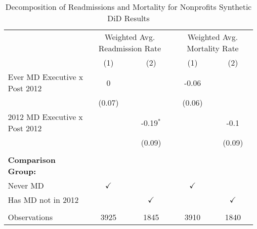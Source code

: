 \begin{table}[ht!]

\caption{\label{tab:MD_noMD_readmort_decomp_synth}Decomposition of Readmissions and Mortality for Nonprofits Synthetic DiD Results}
\centering
\begin{tabular}[t]{lcccc}
\toprule
\multicolumn{1}{c}{ } & \multicolumn{2}{c}{Weighted Avg. Readmission Rate} & \multicolumn{2}{c}{Weighted Avg. Mortality Rate} \\
\cmidrule(l{3pt}r{3pt}){2-3} \cmidrule(l{3pt}r{3pt}){4-5}
 & (1) & (2) & (1) & (2)\\
\midrule
Ever MD Executive x Post 2012 & 0 &  & -0.06 & \\
 & (0.07) &  & (0.06) & \\
2012 MD Executive x Post 2012 &  & -0.19$^{*}$ &  & -0.1\\
 &  & (0.09) &  & (0.09)\\
 &  &  & & \\
\addlinespace
\textbf{Comparison Group:} &  &  &  & \\
Never MD & $\checkmark$ &  & $\checkmark$ & \\
Has MD not in 2012 &  & $\checkmark$ &  & $\checkmark$\\
 &  &  &  & \\
Observations & 3925 & 1845 & 3910 & 1840\\
\bottomrule
\end{tabular}
\end{table}
